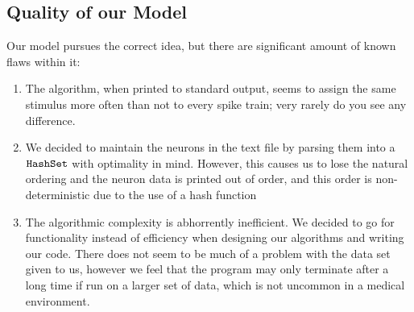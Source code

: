 \documentclass[12pt]{article} %
\begin{document}
\subsection{Quality of our Model}
Our model pursues the correct idea, but there are significant amount of known flaws within it:
\begin{enumerate}
\item{The algorithm, when printed to standard output, seems to assign the same stimulus more often than not to every spike train; very rarely do you see any difference.}
\item{We decided to maintain the neurons in the text file by parsing them into a $\tt{HashSet}$ with optimality in mind. However, this causes us to lose the natural ordering and the neuron data is printed out of order, and this order is non-deterministic due to the use of a hash function}
\item{The algorithmic complexity is abhorrently inefficient. We decided to go for functionality instead of efficiency when designing our algorithms and writing our code. There does not seem to be much of a problem with the data set given to us, however we feel that the program may only terminate after a long time if run on a larger set of data, which is not uncommon in a medical environment.}


\end{enumerate}
\end{document}
